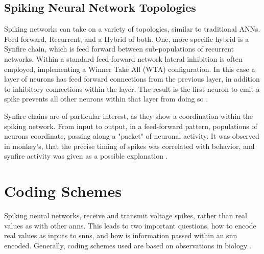     
    \subsection{Spiking Neural Network Topologies}
    Spiking networks can take on a variety of topologies, similar to traditional
    ANNs. Feed forward, Recurrent, and a Hybrid of both. One, more specific
    hybrid is a Synfire chain, which is feed forward between sub-populations of
    recurrent networks. Within a standard feed-forward network lateral
    inhibition is often employed, implementing a Winner Take All (WTA)
    configuration. In this case a layer of neurons has feed forward connections
    from the previous layer, in addition to inhibitory connections within the
    layer. The result is the first neuron to emit a spike prevents all other
    neurons within that layer from doing so \cite{ponulakn_2011}.
    
    Synfire chains are of particular interest, as they show a coordination
    within the spiking network. From input to output, in a feed-forward pattern,
    populations of neurons coordinate, passing along a "packet" of neuronal
    activity. It was observed in monkey's, that the precise timing of spikes was
    correlated with behavior, and synfire activity was given as a possible
    explanation \cite{aertsen_1996}.
    
    \section{Coding Schemes}
    Spiking neural networks, receive and transmit voltage spikes, rather than
    real values as with other \Glspl{ann}. This leads to two important
    questions, how to encode real values as inputs to \Glspl{snn}, and how is
    information passed within an \Gls{snn} encoded. Generally, coding schemes
    used are based on observations in biology \cite{ponulak_2011}.
    
